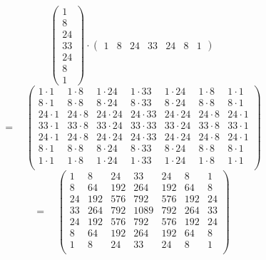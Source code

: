 \documentclass[fontsize=9pt,paper=letter,pagesize]{scrartcl}
\begin{document}
  
  
$$
  \left(
    \begin{array}{c}
      1   \\  8  \\  24  \\  33  \\  24 \\    8  \\   1
    \end{array}
  \right)
  \cdot 
  \left(
    \begin{array}{ccccccc}
      1   &  8  &  24  &  33  &  24  &   8  &   1
    \end{array}
  \right)
$$
$$
  =
  \quad
  \left(
    \begin{array}{rrrrrrr}
      1 \cdot 1   &  1 \cdot 8  &  1 \cdot 24  &  1 \cdot 33  &  1 \cdot 24  &  1 \cdot 8  &  1 \cdot 1 \\
      8 \cdot 1   &  8 \cdot 8  &  8 \cdot 24  &  8 \cdot 33  &  8 \cdot 24  &  8 \cdot 8  & 8 \cdot 1 \\
      24 \cdot 1   &  24 \cdot 8  &  24 \cdot 24  & 24 \cdot 33  &  24 \cdot 24  & 24  \cdot 8  & 24  \cdot 1 \\
      33 \cdot 1   &  33\cdot 8  &  33\cdot 24  & 33 \cdot 33  & 33 \cdot 24  &  33\cdot 8  & 33 \cdot 1 \\
      24 \cdot 1   &  24 \cdot 8  &  24 \cdot 24  & 24  \cdot 33  & 24  \cdot 24  & 24  \cdot 8  & 24  \cdot 1 \\
      8 \cdot 1   &  8 \cdot 8  &  8 \cdot 24  &  8 \cdot 33  &  8 \cdot 24  &  8 \cdot 8  &  8 \cdot 1 \\
      1 \cdot 1   &  1 \cdot 8  &  1 \cdot 24  &  1 \cdot 33  &  1 \cdot 24  &  1 \cdot 8  &  1 \cdot 1 \\
    \end{array}
  \right)
$$
$$
  =
  \quad
  \left(
    \begin{array}{ccccccc}
      1   &        8    &      24   &       33   &       24   &        8  &         1 \\
      8   &       64    &     192  &       264   &      192   &       64  &         8 \\
      24    &     192     &    576    &     792     &    576    &     192    &      24 \\
      33     &    264    &     792    &    1089    &     792     &    264     &     33 \\
      24    &     192     &    576    &     792     &    576    &     192    &      24 \\
      8   &       64    &     192  &       264   &      192   &       64  &         8 \\
      1   &        8    &      24   &       33   &       24   &        8  &         1 \\
    \end{array}
  \right)
$$
  
  
\end{document}
